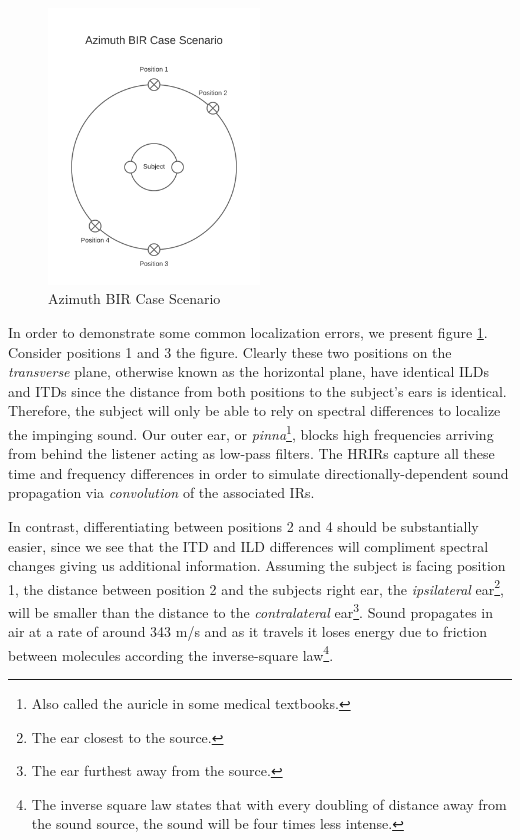 \begin{figure}[ht!]%
\centering
\includegraphics[width=0.5\textwidth]{img/azimuth-bir.png}
\caption{Azimuth BIR Case Scenario}
\label{fig:azimuth-bir}
\end{figure}

In order to demonstrate some common localization errors, we present figure \ref{fig:azimuth-bir}. Consider positions 1 and 3 the figure. Clearly these two positions on the \textit{transverse} plane, otherwise known as the horizontal plane, have identical ILDs and ITDs since the distance from both positions to the subject's ears is identical. Therefore, the subject will only be able to rely on spectral differences to localize the impinging sound. Our outer ear, or \textit{pinna}\footnote{Also called the auricle in some medical textbooks.}, blocks high frequencies arriving from behind the listener acting as low-pass filters. The HRIRs capture all these time and frequency differences in order to simulate directionally-dependent sound propagation via \textit{convolution} of the associated IRs. 

In contrast, differentiating between positions 2 and 4 should be substantially easier, since we see that the ITD and ILD differences will compliment spectral changes giving us additional information. Assuming the subject is facing position 1, the distance between position 2 and the subjects right ear, the \textit{ipsilateral} ear\footnote{The ear closest to the source.}, will be smaller than the distance to the \textit{contralateral} ear\footnote{The ear furthest away from the source.}. Sound propagates in air at a rate of around 343 m/s and as it travels it loses energy due to friction between molecules according the inverse-square law\footnote{The inverse square law states that with every doubling of distance away from the sound source, the sound will be four times less intense.}. 

